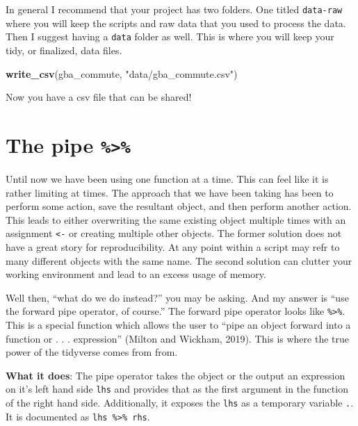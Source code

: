 \documentclass[
]{book}
\newenvironment{Shaded}{\begin{snugshade}}{\end{snugshade}}
\newcommand{\KeywordTok}[1]{\textcolor[rgb]{0.13,0.29,0.53}{\textbf{#1}}}
\newcommand{\NormalTok}[1]{#1}
\newcommand{\StringTok}[1]{\textcolor[rgb]{0.31,0.60,0.02}{#1}}
\begin{document}
In general I recommend that your project has two folders. One titled \texttt{data-raw} where you will keep the scripts and raw data that you used to process the data. Then I suggest having a \texttt{data} folder as well. This is where you will keep your tidy, or finalized, data files.

\begin{Shaded}
\begin{Highlighting}[]
\KeywordTok{write\_csv}\NormalTok{(gba\_commute, }\StringTok{"data/gba\_commute.csv"}\NormalTok{)}
\end{Highlighting}
\end{Shaded}

Now you have a csv file that can be shared!

\hypertarget{the-pipe}{%
\chapter{\texorpdfstring{The pipe \texttt{\%\textgreater{}\%}}{The pipe \%\textgreater\%}}\label{the-pipe}}

Until now we have been using one function at a time. This can feel like it is rather limiting at times. The approach that we have been taking has been to perform some action, save the resultant object, and then perform another action. This leads to either overwriting the same existing object multiple times with an assignment \texttt{\textless{}-} or creating multiple other objects. The former solution does not have a great story for reproducibility. At any point within a script may refr to many different objects with the same name. The second solution can clutter your working environment and lead to an excess usage of memory.

Well then, ``what do we do instead?'' you may be asking. And my answer is ``use the forward pipe operator, of course.'' The forward pipe operator looks like \texttt{\%\textgreater{}\%}. This is a special function which allows the user to ``pipe an object forward into a function or . . . expression'' (Milton and Wickham, 2019). This is where the true power of the tidyverse comes from from.

\textbf{What it does}: The pipe operator takes the object or the output an expression on it's left hand side \texttt{lhs} and provides that as the first argument in the function of the right hand side. Additionally, it exposes the \texttt{lhs} as a temporary variable \texttt{.}. It is documented as \texttt{lhs\ \%\textgreater{}\%\ rhs}.
\end{document}
